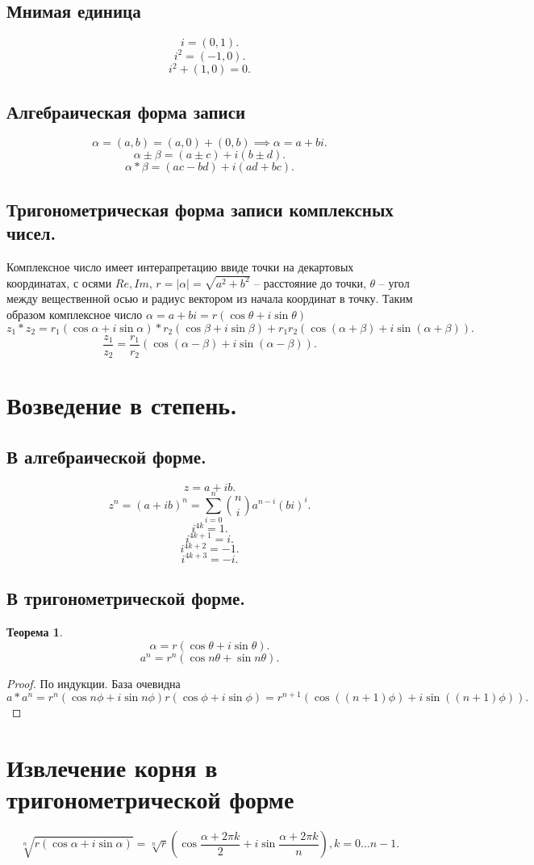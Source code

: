\documentclass{scrartcl}
\newtheorem{theorem}{Теорема}
\begin{document}
    \subsection{Мнимая единица}
    \[
    i = (0,1)
    .\] 
    \[
    i^2 = (-1, 0)
    .\] 
    \[
    i^2 + (1, 0) = 0
    .\] 
    \subsection{Алгебраическая форма записи}
    \[
    \alpha = (a,b) = (a,0) + (0,b) \implies \alpha = a + bi
    .\] 
    \[
    \alpha  \pm \beta = (a \pm c) + i(b \pm d)
    .\] 
    \[
    \alpha * \beta = (ac - bd) + i(ad + bc)
    .\] 
    \subsection{Тригонометрическая форма записи комплексных чисел.}
    Комплексное число имеет интерапретацию ввиде точки на декартовых координатах, с осями $Re, Im$,  $r = |\alpha| = \sqrt{a^2 + b^2} $ -- расстояние до точки, $\theta$ -- угол между вещественной осью и радиус вектором из начала координат в точку.
    Таким образом комплексное число  $\alpha = a+bi = r(\cos{\theta} + i\sin{\theta})$
     \[
         z_1 * z_2 = r_1(\cos{\alpha} + i\sin{\alpha}) * r_2(\cos{\beta} + i\sin{\beta}) + r_1r_2 (\cos{( \alpha + \beta )} + i \sin{( \alpha + \beta )})
    .\] 
    \[
        \frac{z_1}{z_2} = \frac{r_1}{r_2} (\cos{( \alpha - \beta )} + i \sin{( \alpha - \beta )})
    .\]
    \section{Возведение в степень.}
    \subsection{В алгебраической форме.}
    \[
    z = a + ib
    .\] 
    \[
        z^{n} = (a + ib)^{n} = \sum_{i=0}^{n} \binom{n}{i} a^{n - i}(bi)^{i}
    .\] 
    \[
    i^{4k} = 1
    .\] 
    \[
    i^{4k + 1} = i
    .\] 
    \[
        i^{4k + 2} = -1
    .\] 
    \[
        i^{4k + 3} = -i
    .\] 
    \subsection{В тригонометрической форме.}
    \begin{theorem}
        \[
            \alpha = r (\cos{\theta} + i \sin{\theta})
        .\] 
        \[
            a^{n} = r^{n} (\cos{n\theta} + \sin{n\theta})
        .\] 
    \end{theorem}
    \begin{proof}
        По индукции. База очевидна
        \[
            a * a^{n} = r^{n} (\cos{n\phi} + i\sin{n\phi}) r (\cos{\phi} + i\sin{\phi}) = r^{n + 1} (\cos{((n + 1) \phi)} + i \sin{((n + 1) \phi)})
        .\] 
    \end{proof}
    \section{Извлечение корня в тригонометрической форме}
    \[
        \sqrt[n]{r( \cos{\alpha} + i\sin{\alpha} )}  =
        \sqrt[n]{r}(\cos{\frac{\alpha + 2\pi k}{2}} + i\sin{\frac{\alpha + 2\pi k}{n}}), k = 0\dots n - 1
    .\] 
\end{document}
